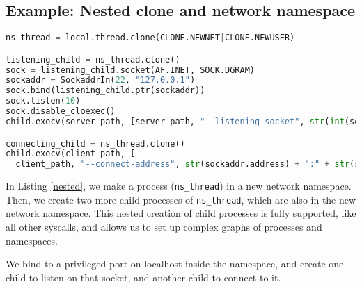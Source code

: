 \documentclass{acmart}
\begin{document}
\subsection{Example: Nested clone and network namespace}
\begin{lstlisting}[float,language=Python,label={nested},caption={Nested clone and network namespace}]
ns_thread = local.thread.clone(CLONE.NEWNET|CLONE.NEWUSER)

listening_child = ns_thread.clone()
sock = listening_child.socket(AF.INET, SOCK.DGRAM)
sockaddr = SockaddrIn(22, "127.0.0.1")
sock.bind(listening_child.ptr(sockaddr))
sock.listen(10)
sock.disable_cloexec()
child.execv(server_path, [server_path, "--listening-socket", str(int(sock))])

connecting_child = ns_thread.clone()
child.execv(client_path, [
  client_path, "--connect-address", str(sockaddr.address) + ":" + str(sockaddr.port)])
\end{lstlisting}
In Listing \ref{nested},
we make a process (\texttt{ns\_thread}) in a new network namespace.
Then, we create two more child processes of \texttt{ns\_thread},
which are also in the new network namespace.
This nested creation of child processes is fully supported,
like all other syscalls,
and allows us to set up complex graphs of processes and namespaces.

We bind to a privileged port on localhost inside the namespace,
and create one child to listen on that socket,
and another child to connect to it.
\end{document}
